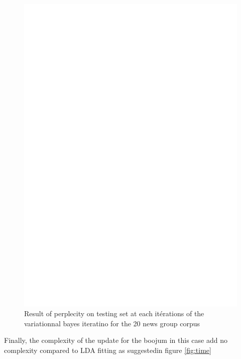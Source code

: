 \begin{figure}[h]
\label{fig:pp_conv}
\includegraphics[scale=0.4]{results/pp_conv.eps}
\caption{Result of perplecity on testing set at each itérations of the variationnal bayes iteratino for the 20 news group corpus}
\end{figure}

Finally, the complexity of the update for the boojum in this case add no complexity compared to LDA fitting as suggestedin figure \ref{fig:time}

